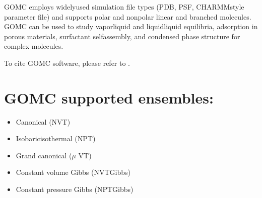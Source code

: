 \documentclass[letterpaper,10pt,english]{sphinxmanual}
\begin{document}
\sphinxAtStartPar
GOMC employs widely\sphinxhyphen{}used simulation file types (PDB, PSF, CHARMM\sphinxhyphen{}style parameter file) and supports polar and non\sphinxhyphen{}polar linear and branched molecules. GOMC can be used to study vapor\sphinxhyphen{}liquid and liquid\sphinxhyphen{}liquid equilibria, adsorption in porous materials, surfactant self\sphinxhyphen{}assembly, and condensed phase structure for complex molecules.

\sphinxAtStartPar
To cite GOMC software, please refer to .


\section{GOMC supported ensembles:}
\label{\detokenize{introduction:gomc-supported-ensembles}}\begin{itemize}
\item {} 
\sphinxAtStartPar
Canonical (NVT)

\item {} 
\sphinxAtStartPar
Isobaric\sphinxhyphen{}isothermal (NPT)

\item {} 
\sphinxAtStartPar
Grand canonical (\(\mu\) VT)

\item {} 
\sphinxAtStartPar
Constant volume Gibbs (NVT\sphinxhyphen{}Gibbs)

\item {} 
\sphinxAtStartPar
Constant pressure Gibbs (NPT\sphinxhyphen{}Gibbs)

\end{itemize}
\end{document}
